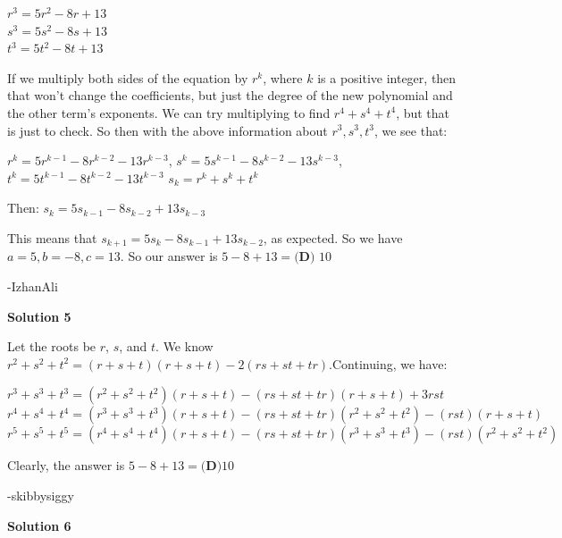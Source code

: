 \begin{enumerate}
 $r^3=5r^2-8r+13$ \\$s^3=5s^2-8s+13$ \\$t^3=5t^2-8t+13$

 If we multiply both sides of the equation by $r^k$, where $k$ is a positive integer, then that won't change the coefficients, but just the degree of the new polynomial and the other term's exponents. We can try multiplying to find $r^4+s^4+t^4$, but that is just to check. So then with the above information about $r^3,s^3,t^3$, we see that:

 $r^k=5r^{k-1}-8r^{k-2}-13r^{k-3}$, $s^k=5s^{k-1}-8s^{k-2}-13s^{k-3}$,$t^k=5t^{k-1}-8t^{k-2}-13t^{k-3}$
$s_k=r^k+s^k+t^k$

 Then: $s_k=5s_{k-1}-8s_{k-2}+13s_{k-3}$

 This means that $s_{k+1}=5s_{k}-8s_{k-1}+13s_{k-2}$, as expected. So we have $a=5, b=-8, c=13$. So our answer is $5-8+13=\boxed{\textbf{(D) } 10}$

 -IzhanAli

 



\textbf{Solution 5}

Let the roots be $r$, $s$, and $t$. We know $r^2+s^2+t^2 = (r+s+t)(r+s+t) - 2(rs+st+tr)$.Continuing, we have:

 
$r^3+s^3+t^3 = (r^2+s^2+t^2)(r+s+t) - (rs+st+tr)(r+s+t)+3rst$
$r^4+s^4+t^4 = (r^3+s^3+t^3)(r+s+t) - (rs+st+tr)(r^2+s^2+t^2)-(rst)(r+s+t)$
$r^5+s^5+t^5 = (r^4+s^4+t^4)(r+s+t) - (rs+st+tr)(r^3+s^3+t^3) - (rst)(r^2+s^2+t^2)$

 
Clearly, the answer is $5-8+13 = \boxed{\textbf{(D)} 10}$

 -skibbysiggy

 



\textbf{Solution 6}


\end{enumerate}
